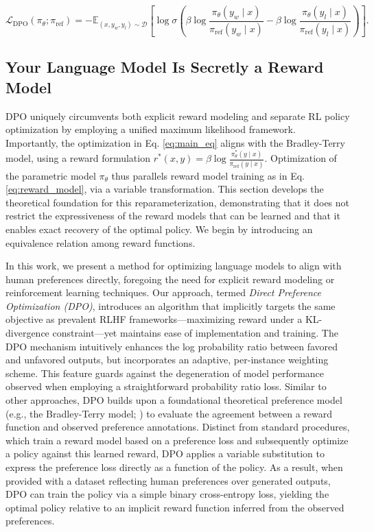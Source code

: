 \begin{equation}\label{eq:optimum_model}
    \mathcal{L}_\text{DPO}(\pi_{\theta}; \pi_\text{ref}) = -\mathbb{E}_{(x, y_w, y_l)\sim \mathcal{D}}\left[\log \sigma \left(\beta \log \frac{\pi_{\theta}(y_w\mid x)}{\pi_\text{ref}(y_w\mid x)} - \beta \log \frac{\pi_{\theta}(y_l\mid x)}{\pi_\text{ref}(y_l\mid x)}\right)\right].
\end{equation}

\subsection{Your Language Model Is Secretly a Reward Model} DPO uniquely circumvents both explicit reward modeling and separate RL policy optimization by employing a unified maximum likelihood framework. Importantly, the optimization in Eq. \ref{eq:main_eq} aligns with the Bradley-Terry model, using a reward formulation $r^*(x, y) = \beta \log\frac{\pi^*_\theta(y \mid x)}{\pi_\text{ref}(y \mid x)}$. Optimization of the parametric model $\pi_{\theta}$ thus parallels reward model training as in Eq. \ref{eq:reward_model}, via a variable transformation. This section develops the theoretical foundation for this reparameterization, demonstrating that it does not restrict the expressiveness of the reward models that can be learned and that it enables exact recovery of the optimal policy. We begin by introducing an equivalence relation among reward functions.

In this work, we present a method for optimizing language models to align with human preferences directly, foregoing the need for explicit reward modeling or reinforcement learning techniques. Our approach, termed \textit{{Direct Preference Optimization} (DPO)}, introduces an algorithm that implicitly targets the same objective as prevalent RLHF frameworks—maximizing reward under a KL-divergence constraint—yet maintains ease of implementation and training. The DPO mechanism intuitively enhances the log probability ratio between favored and unfavored outputs, but incorporates an adaptive, per-instance weighting scheme. This feature guards against the degeneration of model performance observed when employing a straightforward probability ratio loss. Similar to other approaches, DPO builds upon a foundational theoretical preference model (e.g., the Bradley-Terry model; \cite{bradley1952rankanalysis}) to evaluate the agreement between a reward function and observed preference annotations. Distinct from standard procedures, which train a reward model based on a preference loss and subsequently optimize a policy against this learned reward, DPO applies a variable substitution to express the preference loss directly as a function of the policy. As a result, when provided with a dataset reflecting human preferences over generated outputs, DPO can train the policy via a simple binary cross-entropy loss, yielding the optimal policy relative to an implicit reward function inferred from the observed preferences.

